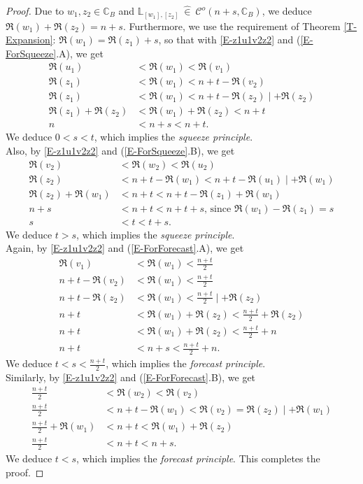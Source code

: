 \documentclass[12pt]{amsart}
\theoremstyle{definition}
\theoremstyle{remark}
\numberwithin{equation}{section}
\newcommand{\inn}{~ \hat{\in}~ }
\newcommand{\C}{\mathcal{C}}
\newcommand{\CC}{\mathbb{C}}
\newcommand{\LL}{\mathbb{L}}
\begin{document}
\begin{proof}
Due to $w_1,z_2\in\CC_B$ and $\LL_{[w_1],[z_2]}\inn \C^o(n+s,\CC_B)$, we deduce $\Re(w_1)+\Re(z_2)=n+s$. Furthermore, we use the requirement of Theorem \ref{T-Expansion}: $\Re(w_1)=\Re(z_1)+s$, so that with \eqref{E-z1u1v2z2} and (\ref{E-ForSqueeze}.A), we get
\begin{align*}
\Re(u_1)&<\Re(w_1)<\Re(v_1)\\
\Re(z_1)&<\Re(w_1)<n+t-\Re(v_2)\\
\Re(z_1)&<\Re(w_1)<n+t-\Re(z_2)\mid +\Re(z_2)\\
\Re(z_1)+\Re(z_2)&<\Re(w_1)+\Re(z_2)<n+t\\
n&<n+s<n+t.
\end{align*} 
We deduce $0<s<t$, which implies the \emph{squeeze principle}.\\

Also, by \eqref{E-z1u1v2z2} and (\ref{E-ForSqueeze}.B), we get
\begin{align*}
\Re(v_2)&<\Re(w_2)<\Re(u_2)\\
\Re(z_2)&<n+t-\Re(w_1)<n+t-\Re(u_1)\mid +\Re(w_1)\\
\Re(z_2)+\Re(w_1)&<n+t<n+t-\Re(z_1)+\Re(w_1)\\
n+s&<n+t<n+t+s\text{, since }\Re(w_1)-\Re(z_1)=s\\
s&<t<t+s.
\end{align*}
We deduce $t>s$, which implies the \emph{squeeze principle}.\\

Again, by \eqref{E-z1u1v2z2} and (\ref{E-ForForecast}.A), we get
\begin{align*}
\Re(v_1)&<\Re(w_1)<\frac{n+t}{2}\\
n+t-\Re(v_2)&<\Re(w_1)<\frac{n+t}{2}\\
n+t-\Re(z_2)&<\Re(w_1)<\frac{n+t}{2}\mid +\Re(z_2) \\
n+t&<\Re(w_1)+\Re(z_2)<\frac{n+t}{2}+\Re(z_2)\\
n+t&<\Re(w_1)+\Re(z_2)<\frac{n+t}{2}+n\\
n+t&<n+s<\frac{n+t}{2}+n.
\end{align*}
We deduce $t<s<\frac{n+t}{2}$, which implies the \emph{forecast principle}.\\

Similarly, by \eqref{E-z1u1v2z2} and (\ref{E-ForForecast}.B), we get
\begin{align*}
\frac{n+t}{2}&<\Re(w_2)<\Re(v_2)\\
\frac{n+t}{2}&<n+t-\Re(w_1)<\Re(v_2)=\Re(z_2)\mid +\Re(w_1)\\
\frac{n+t}{2}+\Re(w_1)&<n+t<\Re(w_1)+\Re(z_2)\\
\frac{n+t}{2}&<n+t<n+s.
\end{align*}
We deduce $t<s$, which implies the \emph{forecast principle}. This completes the proof.
\end{proof}
\end{document}
